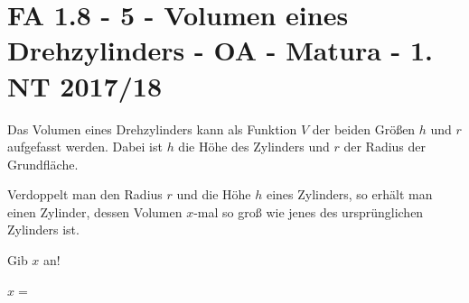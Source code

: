 \section{FA 1.8 - 5 - Volumen eines Drehzylinders - OA - Matura - 1. NT 2017/18}

\begin{beispiel}[FA 1.8]{1}
Das Volumen eines Drehzylinders kann als Funktion $V$ der beiden Größen $h$ und $r$ aufgefasst werden. Dabei ist $h$ die Höhe des Zylinders und $r$ der Radius der Grundfläche.

Verdoppelt man den Radius $r$ und die Höhe $h$ eines Zylinders, so erhält man einen Zylinder, dessen Volumen $x$-mal so groß wie jenes des ursprünglichen Zylinders ist.

Gib $x$ an!\leer

$x=$\,
\end{beispiel}